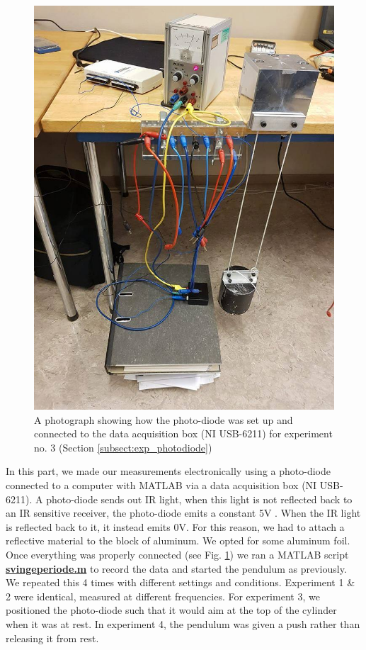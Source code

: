 \documentclass[%
 reprint,
 amsmath,amssymb,
 aps,
]{revtex4-1}
\begin{document}
        \begin{figure}
            \center
            \includegraphics[scale=0.3]{experiment3.jpg}
            \caption{A photograph showing how the photo-diode was set up and connected to the data acquisition box (NI USB-6211) for experiment no. 3 (Section \ref{subsect:exp_photodiode})}
            \label{fig:pendulum3}
        \end{figure}

        In this part, we made our measurements electronically using a photo-diode connected to a computer with MATLAB via a data acquisition box (NI USB-6211). A photo-diode sends out IR light, when this light is not reflected back to an IR sensitive receiver, the photo-diode emits a constant 5V . When the IR light is reflected back to it, it instead emits 0V. For this reason, we had to attach a reflective material to the block of aluminum. We opted for some aluminum foil.
        Once everything was properly connected (see Fig. \ref{fig:pendulum3}) we ran a MATLAB script \href{http://www.uio.no/studier/emner/matnat/fys/FYS2150/v18/kursmateriell/tid-og-frekvens/svingeperiode.m}{\textbf{svingeperiode.m}} to record the data and started the pendulum as previously. We repeated this 4 times with different settings and conditions.
        Experiment 1 \& 2 were identical, measured at different frequencies. For experiment 3, we positioned the photo-diode such that it would aim at the top of the cylinder when it was at rest. In experiment 4, the pendulum was given a push rather than releasing it from rest.
\end{document}
